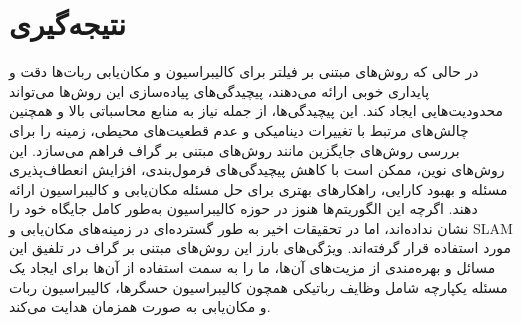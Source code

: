 \section{نتیجه‌گیری}
در حالی که روش‌های مبتنی بر فیلتر برای کالیبراسیون و مکان‌یابی ربات‌ها دقت و پایداری خوبی ارائه می‌دهند، پیچیدگی‌های پیاده‌سازی این روش‌ها می‌تواند محدودیت‌هایی ایجاد کند. این پیچیدگی‌ها، از جمله نیاز به منابع محاسباتی بالا و همچنین چالش‌های مرتبط با تغییرات دینامیکی و عدم قطعیت‌های محیطی، زمینه را برای بررسی روش‌های جایگزین مانند روش‌های مبتنی بر گراف فراهم می‌سازد. این روش‌های نوین، ممکن است با کاهش پیچیدگی‌های فرمول‌بندی، افزایش انعطاف‌پذیری مسئله و بهبود کارایی، راهکارهای بهتری برای حل مسئله مکان‌یابی و کالیبراسیون ارائه دهند. اگرچه این الگوریتم‌ها هنوز در حوزه کالیبراسیون به‌طور کامل جایگاه خود را نشان نداده‌اند، اما در تحقیقات اخیر به طور گسترده‌ای در زمینه‌های مکان‌یابی و SLAM مورد استفاده قرار گرفته‌اند. ویژگی‌های بارز این روش‌های مبتنی بر گراف در تلفیق این مسائل و بهره‌مندی از مزیت‌های آن‌ها، ما را به سمت استفاده از آن‌ها برای ایجاد یک مسئله یکپارچه شامل وظایف رباتیکی همچون کالیبراسیون حسگرها، کالیبراسیون ربات و مکان‌یابی به صورت همزمان هدایت می‌کند.


